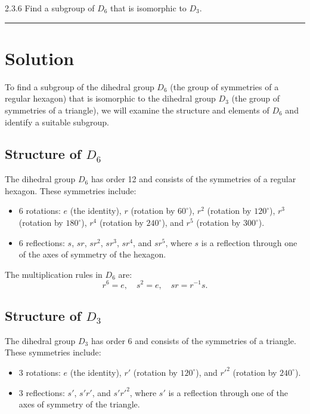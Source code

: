 \documentclass[12pt]{amsart}
\theoremstyle{definition}
\numberwithin{equation}{section}
\begin{document}
\begin{exercise}{2.3.6} 
    Find a subgroup of \(D_6\) that is isomorphic to \(D_3\).
    
    \noindent\rule{\linewidth}{1pt}
    
    \section*{Solution}
    
    To find a subgroup of the dihedral group \(D_6\) (the group of symmetries of a regular hexagon) that is isomorphic to the dihedral group \(D_3\) (the group of symmetries of a triangle), we will examine the structure and elements of \(D_6\) and identify a suitable subgroup.
    
    \subsection*{Structure of \(D_6\)}
    
    The dihedral group \(D_6\) has order 12 and consists of the symmetries of a regular hexagon. These symmetries include:
    \begin{itemize}
        \item \(6\) rotations: \(e\) (the identity), \(r\) (rotation by \(60^\circ\)), \(r^2\) (rotation by \(120^\circ\)), \(r^3\) (rotation by \(180^\circ\)), \(r^4\) (rotation by \(240^\circ\)), and \(r^5\) (rotation by \(300^\circ\)).
        \item \(6\) reflections: \(s\), \(sr\), \(sr^2\), \(sr^3\), \(sr^4\), and \(sr^5\), where \(s\) is a reflection through one of the axes of symmetry of the hexagon.
    \end{itemize}
    
    The multiplication rules in \(D_6\) are:
    \[
    r^6 = e, \quad s^2 = e, \quad sr = r^{-1}s.
    \]
    
    \subsection*{Structure of \(D_3\)}
    
    The dihedral group \(D_3\) has order 6 and consists of the symmetries of a triangle. These symmetries include:
    \begin{itemize}
        \item \(3\) rotations: \(e\) (the identity), \(r'\) (rotation by \(120^\circ\)), and \(r'^2\) (rotation by \(240^\circ\)).
        \item \(3\) reflections: \(s'\), \(s'r'\), and \(s'r'^2\), where \(s'\) is a reflection through one of the axes of symmetry of the triangle.
    \end{itemize}
    

\end{exercise}
\end{document}
